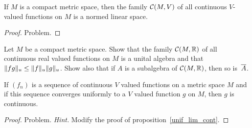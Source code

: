 \begin{exam} If $M$ is a compact metric space, then the family $\mathcal{C}(M,V)$ of all continuous
$V$-valued functions on $M$ is a normed linear space.
\end{exam}

\begin{proof} Problem.  \ns  \end{proof}

\begin{prob}\label{prob_clo_alg}  Let $M$ be a compact metric space.  Show that the family
$\mathcal{C}(M,\mathbb{R})$ of all continuous real valued functions on $M$ is a unital algebra and that
$\lVert fg\rVert_u \le \lVert f\rVert_u\lVert g\rVert_u$.  Show also that if $A$ is a subalgebra of $\mathcal{C}(M,\mathbb{R})$, then so is~$\overline{A}$.
\end{prob}

\begin{prop}\label{prop_unif_lim} If $(f_n)$ is a sequence of continuous $V$ valued functions
on a metric space $M$ and if this sequence converges uniformly to a $V$ valued function $g$ on
$M$, then $g$ is continuous.
\end{prop}

\begin{proof} Problem.  \emph{Hint.}  Modify the proof of proposition~\ref{unif_lim_cont}.   \ns
\end{proof}





\endinput
